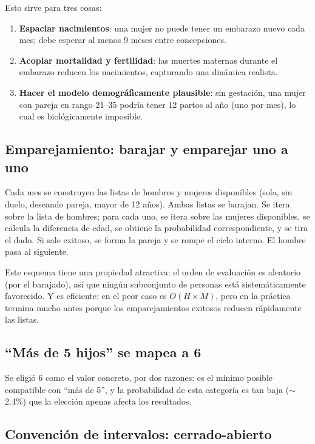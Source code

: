 \documentclass[12pt,a4paper]{article}
\begin{document}
Esto sirve para tres cosas:

\begin{enumerate}
    \item \textbf{Espaciar nacimientos}: una mujer no puede tener un embarazo nuevo cada mes; debe esperar al menos 9 meses entre concepciones.
    \item \textbf{Acoplar mortalidad y fertilidad}: las muertes maternas durante el embarazo reducen los nacimientos, capturando una dinámica realista.
    \item \textbf{Hacer el modelo demográficamente plausible}: sin gestación, una mujer con pareja en rango 21--35 podría tener 12 partos al año (uno por mes), lo cual es biológicamente imposible.
\end{enumerate}

\subsection{Emparejamiento: barajar y emparejar uno a uno}

Cada mes se construyen las listas de hombres y mujeres disponibles (sola, sin duelo, deseando pareja, mayor de 12 años). Ambas listas se barajan. Se itera sobre la lista de hombres; para cada uno, se itera sobre las mujeres disponibles, se calcula la diferencia de edad, se obtiene la probabilidad correspondiente, y se tira el dado. Si sale exitoso, se forma la pareja y se rompe el ciclo interno. El hombre pasa al siguiente.

Este esquema tiene una propiedad atractiva: el orden de evaluación es aleatorio (por el barajado), así que ningún subconjunto de personas está sistemáticamente favorecido. Y es eficiente: en el peor caso es $O(H \times M)$, pero en la práctica termina mucho antes porque los emparejamientos exitosos reducen rápidamente las listas.

\subsection{``Más de 5 hijos'' se mapea a 6}

Se eligió 6 como el valor concreto, por dos razones: es el mínimo posible compatible con ``más de 5'', y la probabilidad de esta categoría es tan baja ($\sim$2.4\%) que la elección apenas afecta los resultados.

\subsection{Convención de intervalos: cerrado-abierto}
\end{document}
